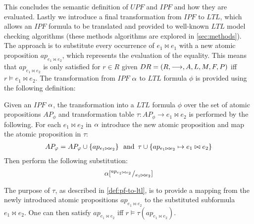 This concludes the semantic definition of $UPF$ and $IPF$ and how they are evaluated. Lastly we introduce a final transformation from $IPF$ to $LTL$, which allows an $IPF$ formula to be translated and provided to well-known $LTL$ model checking algorithms (these methods algorithms are explored in \autoref{sec:methods}). The approach is to substitute every occurrence of $e_1 \bowtie e_1$ with a new atomic proposition $ap_{e_1 \bowtie e_2}$, which represents the evaluation of the equality. This means that $ap_{e_1 \bowtie e_2}$ is only satisfied for $r \in R$ given $\DR$ iff $r \models e_1 \bowtie e_2$. The transformation from $IPF$ $\pf$ to $LTL$ formula $\phi$ is provided using the following definition:
\begin{definition}\label{def:pf-to-ltl}
Given an $IPF$ $\pf$, the transformation into a $LTL$ formula $\phi$ over the set of atomic propositions $AP_\phi$ and transformation table $\tau : AP_\phi \rightarrow e_1 \bowtie e_2$ is performed by the following. For each $e_1 \bowtie e_2$ in $\pf$ introduce the new atomic proposition and map the atomic proposition in $\tau$:
\begin{align*}
    AP_\phi = AP_\phi \cup \left\{ap_{e_1 \bowtie e_2}\right\} \enskip \text{and} \enskip 
    \tau \cup \{ap_{e_1 \bowtie e_2} \mapsto e_1 \bowtie e_2\}
\end{align*}
Then perform the following substitution:
\begin{align*}
    \pf[^{ap_{e_1 \bowtie e_2}}/_{e_1 \bowtie e_2}]
\end{align*}
\end{definition}
The purpose of $\tau$, as described in \autoref{def:pf-to-ltl}, is to provide a mapping from the newly introduced atomic propositions $ap_{e_1 \bowtie e_2}$ to the substituted subformula $e_1 \bowtie e_2$. One can then satisfy $ap_{e_1 \bowtie e_2}$ iff $r \models \tau(ap_{e_1 \bowtie e_2})$.